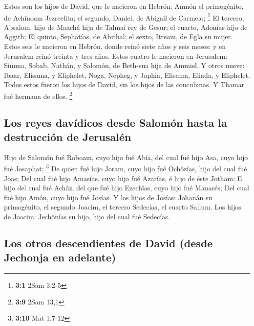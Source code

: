  Estos son los hijos de David, que le nacieron en Hebrón:
Amnón el primogénito, de Achînoam Jezreelita; el segundo, Daniel, de
Abigail de Carmelo; \footnote{\textbf{3:1} 2Sam 3,2-5}  El
tercero, Absalom, hijo de Maachâ hija de Talmai rey de Gesur; el cuarto,
Adonías hijo de Aggith;  El quinto, Sephatías, de Abithal;
el sexto, Itream, de Egla su mujer.  Estos seis le
nacieron en Hebrón, donde reinó siete años y seis meses: y en Jerusalem
reinó treinta y tres años.  Estos cuatro le nacieron en
Jerusalem: Simma, Sobab, Nathán, y Salomón, de Beth-sua hija de Ammiel.
 Y otros nueve: Ibaar, Elisama, y Eliphelet,
 Noga, Nepheg, y Japhia,  Elisama, Eliada, y
Eliphelet.  Todos estos fueron los hijos de David, sin los
hijos de las concubinas. Y Thamar fué hermana de ellos. \footnote{\textbf{3:9}
  2Sam 13,1}

\hypertarget{los-reyes-davuxeddicos-desde-salomuxf3n-hasta-la-destrucciuxf3n-de-jerusaluxe9n}{%
\subsection{Los reyes davídicos desde Salomón hasta la destrucción de
Jerusalén}\label{los-reyes-davuxeddicos-desde-salomuxf3n-hasta-la-destrucciuxf3n-de-jerusaluxe9n}}

 Hijo de Salomón fué Roboam, cuyo hijo fué Abía, del cual
fué hijo Asa, cuyo hijo fué Josaphat; \footnote{\textbf{3:10} Mat 1,7-12}
 De quien fué hijo Joram, cuyo hijo fué Ochôzías, hijo
del cual fué Joas;  Del cual fué hijo Amasías, cuyo hijo
fué Azarías, é hijo de éste Jotham;  E hijo del cual fué
Achâz, del que fué hijo Ezechîas, cuyo hijo fué Manasés; 
Del cual fué hijo Amón, cuyo hijo fué Josías.  Y los
hijos de Josías: Johanán su primogénito, el segundo Joacim, el tercero
Sedecías, el cuarto Sallum.  Los hijos de Joacim:
Jechônías su hijo, hijo del cual fué Sedecías.

\hypertarget{los-otros-descendientes-de-david-desde-jechonja-en-adelante}{%
\subsection{Los otros descendientes de David (desde Jechonja en
adelante)}\label{los-otros-descendientes-de-david-desde-jechonja-en-adelante}}

